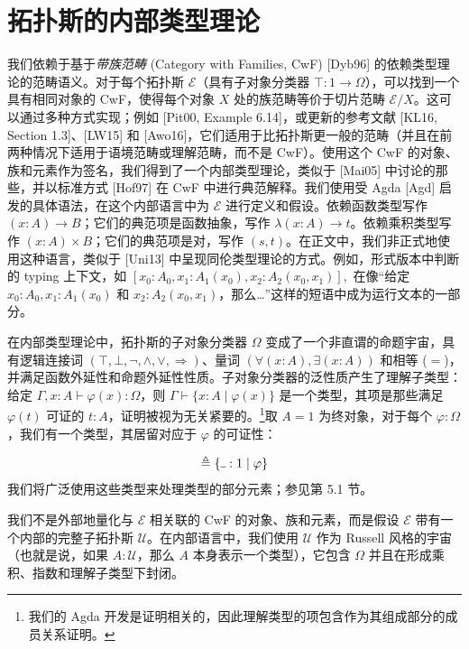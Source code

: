 \documentclass{ctexart}
\theoremstyle{plain}
\theoremstyle{definition}
\theoremstyle{definition}
\theoremstyle{definition}
\theoremstyle{definition}
\newcommand{\ul}{{\rule[0ex]{0.4em}{0.4pt}}} %
\numberwithin{equation}{section}
\begin{document}
\section{拓扑斯的内部类型理论}

我们依赖于基于\textit{带族范畴} (Category with Families, CwF) [Dyb96] 的依赖类型理论的范畴语义。对于每个拓扑斯 $ \mathcal{E} $（具有子对象分类器 $ \top : 1 \to \Omega $），可以找到一个具有相同对象的 CwF，使得每个对象 $ X $ 处的族范畴等价于切片范畴 $ \mathcal{E}/X $。这可以通过多种方式实现；例如 [Pit00, Example 6.14]，或更新的参考文献 [KL16, Section 1.3]、[LW15] 和 [Awo16]，它们适用于比拓扑斯更一般的范畴（并且在前两种情况下适用于语境范畴或理解范畴，而不是 CwF）。使用这个 CwF 的对象、族和元素作为签名，我们得到了一个内部类型理论，类似于 [Mai05] 中讨论的那些，并以标准方式 [Hof97] 在 CwF 中进行典范解释。我们使用受 Agda [Agd] 启发的具体语法，在这个内部语言中为 $ \mathcal{E} $ 进行定义和假设。依赖函数类型写作 $ (x : A) \to B $；它们的典范项是函数抽象，写作 $ \lambda(x : A) \to t $。依赖乘积类型写作 $ (x : A) \times B $；它们的典范项是对，写作 $ (s, t) $。在正文中，我们非正式地使用这种语言，类似于 [Uni13] 中呈现同伦类型理论的方式。例如，形式版本中判断的 typing 上下文，如
$[x_0 : A_0, x_1 : A_1(x_0), x_2 : A_2(x_0, x_1)],$
在像“给定 $ x_0 : A_0, x_1 : A_1(x_0) $ 和 $ x_2 : A_2(x_0, x_1) $，那么…”这样的短语中成为运行文本的一部分。

在内部类型理论中，拓扑斯的子对象分类器 $ \Omega $ 变成了一个非直谓的命题宇宙，具有逻辑连接词 $ (\top, \bot, \neg, \land, \lor, \Rightarrow) $、量词 $ (\forall(x : A), \exists(x : A)) $ 和相等 ($=$)，并满足函数外延性和命题外延性性质。子对象分类器的泛性质产生了理解子类型：给定 $ \Gamma, x : A \vdash \varphi(x) : \Omega $，则 $ \Gamma \vdash \{x : A \mid \varphi(x)\} $ 是一个类型，其项是那些满足 $ \varphi(t) $ 可证的 $ t : A $，证明被视为无关紧要的。\footnote{我们的 Agda 开发是证明相关的，因此理解类型的项包含作为其组成部分的成员关系证明。}取 $ A = 1 $ 为终对象，对于每个 $ \varphi : \Omega $，我们有一个类型，其居留对应于 $ \varphi $ 的可证性：

\begin{equation}[\varphi] \triangleq \{ \ul : 1 \mid \varphi \}\end{equation}
我们将广泛使用这些类型来处理类型的部分元素；参见第 5.1 节。

我们不是外部地量化与 $ \mathcal{E} $ 相关联的 CwF 的对象、族和元素，而是假设 $ \mathcal{E} $ 带有一个内部的完整子拓扑斯 $ \mathcal{U} $。在内部语言中，我们使用 $ \mathcal{U} $ 作为 Russell 风格的宇宙（也就是说，如果 $ A : \mathcal{U} $，那么 $ A $ 本身表示一个类型），它包含 $ \Omega $ 并且在形成乘积、指数和理解子类型下封闭。
\end{document}
